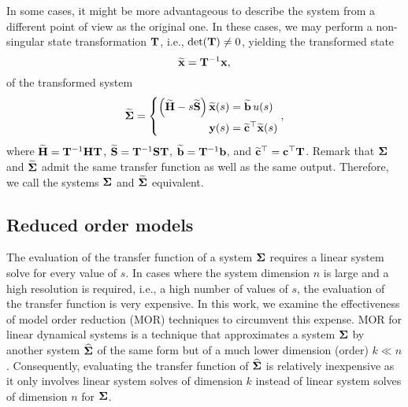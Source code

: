 In some cases, it might be more advantageous to describe the system from a different point of view as the original one. In these cases, we may perform a non-singular state transformation $\mathbf{T}$, i.e., $\det(\mathbf{T}) \neq 0$, yielding the transformed state
\begin{equation}
  \widetilde{\mathbf{x}} = \mathbf{T}^{-1} \mathbf{x},
  \label{eq:defxtil}
\end{equation}
of the transformed system
\begin{equation}
  \widetilde{\mathbf{\Sigma}} = \left\{\begin{aligned}
    \left( \widetilde{\mathbf{H}} - s\widetilde{\mathbf{S}} \right) \widetilde{\mathbf{x}}(s) &= \widetilde{\mathbf{b}}\,u(s) \\
                                 \mathbf{y}(s) &= \widetilde{\mathbf{c}}^\top \widetilde{\mathbf{x}}(s)
  \end{aligned}\right.,
\end{equation}
where $\widetilde{\mathbf{H}} = \mathbf{T}^{-1} \mathbf{H} \mathbf{T}$, $\widetilde{\mathbf{S}} = \mathbf{T}^{-1} \mathbf{S} \mathbf{T}$, $\widetilde{\mathbf{b}} = \mathbf{T}^{-1} \mathbf{b}$, and $\widetilde{\mathbf{c}}^\top = \mathbf{c}^\top \mathbf{T}$. Remark that $\mathbf{\Sigma}$ and $\widetilde{\mathbf{\Sigma}}$ admit the same transfer function as well as the same output. Therefore, we call the systems $\mathbf{\Sigma}$ and $\widetilde{\mathbf{\Sigma}}$ equivalent.

\subsection{Reduced order models}
\label{lds:mor}

The evaluation of the transfer function of a system $\mathbf{\Sigma}$ requires a linear system solve for every value of $s$. In cases where the system dimension $n$ is large and a high resolution is required, i.e., a high number of values of $s$, the evaluation of the transfer function is very expensive. In this work, we examine the effectiveness of model order reduction (MOR) techniques to circumvent this expense. MOR for linear dynamical systems is a technique that approximates a system $\mathbf{\Sigma}$ by another system $\widehat{\mathbf{\Sigma}}$ of the same form but of a much lower dimension (order) $k \ll n$. Consequently, evaluating the transfer function of $\widehat{\mathbf{\Sigma}}$ is relatively inexpensive as it only involves linear system solves of dimension $k$ instead of linear system solves of dimension $n$ for $\mathbf{\Sigma}$.

